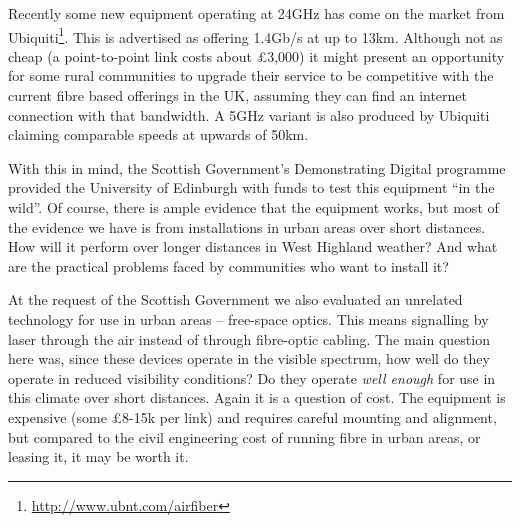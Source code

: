 \documentclass{amsart}
\begin{document}
Recently some new equipment operating at 24GHz has come on the market
from Ubiquiti\footnote{\href{http://www.ubnt.com/airfiber}{\url{http://www.ubnt.com/airfiber}}}.
This is advertised as offering 1.4Gb/s at up to 13km. Although not as
cheap (a point-to-point link costs about \pounds 3,000) it might present
an opportunity for some rural communities to upgrade their service to
be competitive with the current fibre based offerings in the UK,
assuming they can find an internet connection with that bandwidth. A
5GHz variant is also produced by Ubiquiti claiming comparable speeds
at upwards of 50km.

With this in mind, the Scottish Government's Demonstrating
Digital programme provided the University of Edinburgh with funds to
test this equipment ``in the wild''. Of course, there is ample evidence
that the equipment works, but most of the evidence we have is
from installations in urban areas over short distances. How will
it perform over longer distances in West Highland weather? And what
are the practical problems faced by communities who want to install it?

At the request of the Scottish Government we also evaluated an
unrelated technology for use in urban areas -- free-space optics. This
means signalling by laser through the air instead of through
fibre-optic cabling. The main question here was, since these devices
operate in the visible spectrum, how well do they operate in reduced
visibility conditions? Do they operate \emph{well enough} for use in
this climate over short distances. Again it is a question of cost. The
equipment is expensive (some \pounds 8-15k per link) and requires
careful mounting and alignment, but compared to the civil engineering
cost of running fibre in urban areas, or leasing it, it may be worth
it.

\clearpage


\clearpage
\printbibliography
\end{document}
